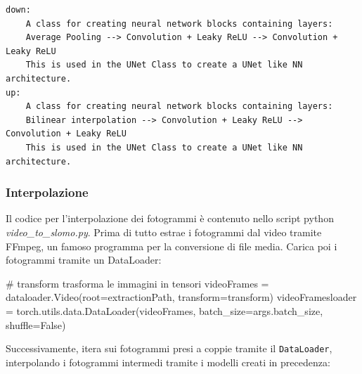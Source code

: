 \begin{verbatim}
down:
    A class for creating neural network blocks containing layers:
    Average Pooling --> Convolution + Leaky ReLU --> Convolution + Leaky ReLU
    This is used in the UNet Class to create a UNet like NN architecture.
up:
    A class for creating neural network blocks containing layers: 
    Bilinear interpolation --> Convolution + Leaky ReLU --> Convolution + Leaky ReLU
    This is used in the UNet Class to create a UNet like NN architecture.
\end{verbatim}

\subsubsection*{Interpolazione}

Il codice per l'interpolazione dei fotogrammi è contenuto nello script python 
\emph{video\_to\_slomo.py}.
Prima di tutto estrae i fotogrammi dal video tramite FFmpeg, un famoso programma per la 
conversione di file media. Carica poi i fotogrammi tramite un DataLoader:

\begin{Python}
# transform trasforma le immagini in tensori
videoFrames = dataloader.Video(root=extractionPath, transform=transform)
videoFramesloader = torch.utils.data.DataLoader(videoFrames, batch_size=args.batch_size, shuffle=False)
\end{Python}

Successivamente, itera sui fotogrammi presi a coppie tramite il \texttt{DataLoader}, interpolando i 
fotogrammi intermedi tramite i modelli creati in precedenza:

